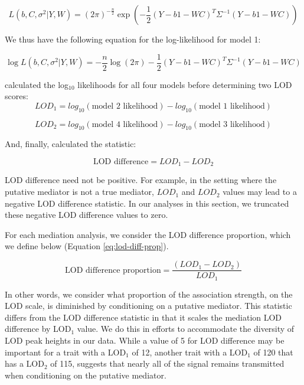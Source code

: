 \documentclass{article}
\begin{document}
\begin{equation}
    L(b, C, \sigma^2| Y, W) = (2\pi)^{- \frac{n}{2}}\exp{ \left(- \frac{1}{2}(Y - b1 - WC)^T\Sigma^{-1}(Y - b1 - WC)\right)}
\end{equation}

We thus have the following equation for the log-likelihood for model 1:

\begin{equation}
    \log L(b, C, \sigma^2 | Y, W) = - \frac{n}{2}\log (2\pi) - \frac{1}{2} (Y - b1 - WC)^T\Sigma^{-1}(Y - b1 - WC)
\end{equation}


\citet{chick2016defining} calculated the log$_{10}$ likelihoods for all four models before determining two LOD scores: 
\begin{equation}
LOD_1 = log_{10}(\text{model 2 likelihood}) - log_{10}(\text{model 1 likelihood})
\end{equation}

\begin{equation}
LOD_2 = log_{10}(\text{model 4 likelihood}) - log_{10}(\text{model 3 likelihood})
\end{equation}

And, finally, \citet{keller2018genetic} calculated the statistic:

\begin{equation}
\text{LOD difference} = LOD_1 - LOD_2
\end{equation}

LOD difference need not be positive. For example, in the setting where the putative mediator is not a true mediator, $LOD_1$ and $LOD_2$ values may lead to a negative LOD difference statistic. In our analyses in this section, we truncated these negative LOD difference values to zero. 

For each mediation analysis, we consider the LOD difference proportion, which we define below (Equation \ref{eq:lod-diff-prop}).

\begin{equation}
\text{LOD difference proportion} = \frac{(LOD_1 - LOD_2)}{LOD_1}
\label{eq:lod-diff-prop}
\end{equation}

In other words, we consider what proportion of the association strength, on the LOD scale, is diminished by conditioning on a putative mediator. This statistic differs from the LOD difference statistic in that it scales the mediation LOD difference by LOD$_1$ value. We do this in efforts to accommodate the diversity of LOD peak heights in our data. While a value of 5 for LOD difference may be important for a trait with a LOD$_1$ of 12, another trait with a LOD$_1$ of 120 that has a LOD$_2$ of 115, suggests that nearly all of the signal remains transmitted when conditioning on the putative mediator.
\end{document}
